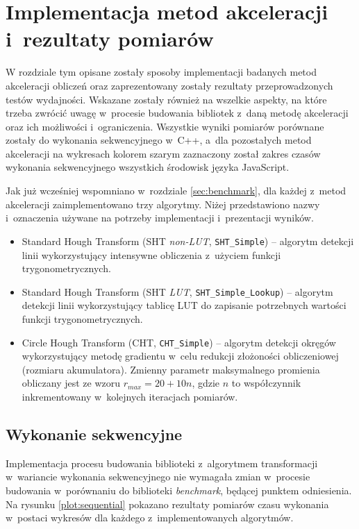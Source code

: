 \chapter{Implementacja metod akceleracji i~rezultaty pomiarów}
\label{sec:methods-results}

W rozdziale tym opisane zostały sposoby implementacji badanych metod akceleracji obliczeń oraz zaprezentowany zostały rezultaty przeprowadzonych testów wydajności. Wskazane zostały również na wszelkie aspekty, na które trzeba zwrócić uwagę w~procesie budowania bibliotek z~daną metodę akceleracji oraz ich możliwości i~ograniczenia. Wszystkie wyniki pomiarów porównane zostały do wykonania sekwencyjnego w~C++, a~dla pozostałych metod akceleracji na wykresach kolorem szarym zaznaczony został zakres czasów wykonania sekwencyjnego wszystkich środowisk języka JavaScript.

Jak już wcześniej wspomniano w~rozdziale \ref{sec:benchmark}, dla każdej z~metod akceleracji zaimplementowano trzy algorytmy. Niżej przedstawiono nazwy i~oznaczenia używane na potrzeby implementacji i~prezentacji wyników.

\begin{itemize}
    \item Standard Hough Transform (SHT \textit{non-LUT}, \lstinline{SHT_Simple}) -- algorytm detekcji linii wykorzystujący intensywne obliczenia z~użyciem funkcji trygonometrycznych.
    \item Standard Hough Transform (SHT \textit{LUT}, \lstinline{SHT_Simple_Lookup}) -- algorytm detekcji linii wykorzystujący tablicę LUT do zapisanie potrzebnych wartości funkcji trygonometrycznych.
    \item Circle Hough Transform (CHT, \lstinline{CHT_Simple}) -- algorytm detekcji okręgów wykorzystujący metodę gradientu w~celu redukcji złożoności obliczeniowej (rozmiaru akumulatora). Zmienny parametr maksymalnego promienia obliczany jest ze wzoru $r_{max} = 20+10n$, gdzie $n$ to współczynnik inkrementowany w~kolejnych iteracjach pomiarów.
\end{itemize}


\section{Wykonanie sekwencyjne}

Implementacja procesu budowania biblioteki z~algorytmem transformacji w~wariancie wykonania sekwencyjnego nie wymagała zmian w~procesie budowania w~porównaniu do biblioteki \textit{benchmark}, będącej punktem odniesienia. Na rysunku \ref{plot:sequential} pokazano rezultaty pomiarów czasu wykonania w~postaci wykresów dla każdego z~implementowanych algorytmów.

